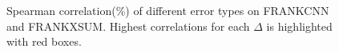 \begin{figure}[t]
	\centering
	\begin{minipage}[t]{0.5\linewidth}
		\centering
	\end{minipage}%
	\begin{minipage}[t]{0.5\linewidth}
		\centering
	\end{minipage}%
	\caption{Spearman correlation(\%) of different error types on FRANKCNN and FRANKXSUM. Highest correlations for each $\Delta$ is highlighted with red boxes.}
	\label{fig:error}
\end{figure}

